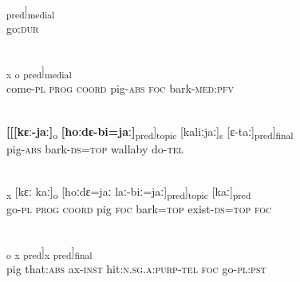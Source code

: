 \documentclass[output=paper]{LSP/langsci}
\begin{document}
\begin{exe}
\ex \label{Aiex:App33}
\gll [[hɛnaːː]\textsubscript{pred}]\textsubscript{medial}\\
go:\textsc{dur}\\
\glt {}\\
\end{exe}

\begin{exe}
\ex \label{Aiex:App34}
\gll [[jɛː-si	dɛnɛ	baːlɛ]\textsubscript{x}	\underline{\smash{[kɛː-jaː}}	\underline{\smash{kaː]}}\textsubscript{o}	\underline{\smash{[hoːdɛ-si]}}\textsubscript{pred}]\textsubscript{medial}\\
come-\textsc{pl}	\textsc{prog}	\textsc{coord}	pig-\textsc{abs}	\textsc{foc}	bark-\textsc{med}:\textsc{pfv}\\
\glt {}\\
\end{exe}

\begin{exe}
\ex \label{Aiex:App35}
\gll \textbf{[[[kɛː-jaː]}\textsubscript{o}	\textbf{[hoːdɛ-bi=jaː]}\textsubscript{pred}]\textsubscript{topic}	[kaliːjaː]\textsubscript{s}	[ɛ-taː]\textsubscript{pred}]\textsubscript{final}\\
pig-\textsc{abs}	bark-\textsc{ds}=\textsc{top}	wallaby	do-\textsc{tel}\\
‎\glt {}\\
\end{exe}

\begin{exe}
\ex \label{Aiex:App36}
\gll [[hɛnɛ-si	dɛnɛ	baːlɛ]\textsubscript{x}	[kɛː	kaː]\textsubscript{o}	[hoːdɛ=jaː	laː-biː=jaː]\textsubscript{pred}]\textsubscript{topic}	[kaː]\textsubscript{pred}\\
go-\textsc{pl}	\textsc{prog}	\textsc{coord}	pig	\textsc{foc}	bark=\textsc{top}	exist-\textsc{ds}=\textsc{top}	\textsc{foc}\\
‎\glt {}\\
\end{exe}

\begin{exe}
\ex \label{Aiex:App37}
\gll [[[kɛː	ɛnaː]\textsubscript{o}	\underline{}\textsubscript{x}	\underline{}\textsubscript{pred}]\textsubscript{x}	\underline{\smash{[kaː}}	\underline{\smash{hɛnɛ-saː]}}\textsubscript{pred}]\textsubscript{final}\\
pig	that:\textsc{abs}	ax-\textsc{inst}	hit:\textsc{n.sg.a}:\textsc{purp}-\textsc{tel}	\textsc{foc}	go-\textsc{pl}:\textsc{pst}\\
‎\glt {}\\
\end{exe}
\end{document}
